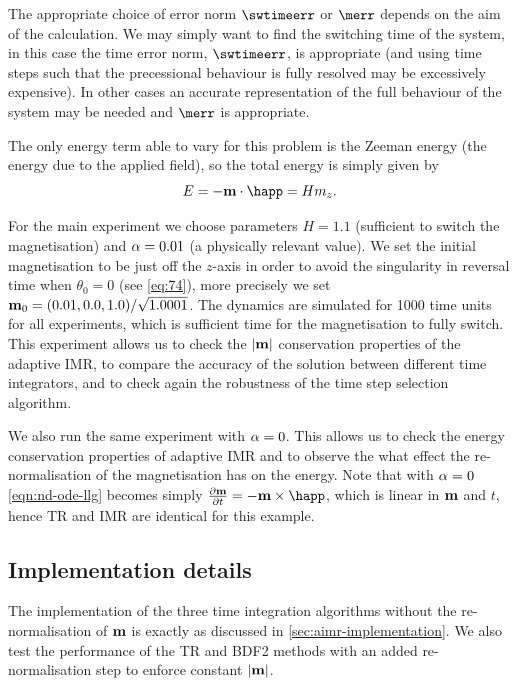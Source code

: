 The appropriate choice of error norm $\swtimeerr$ or $\merr$ depends on the aim of the calculation.
We may simply want to find the switching time of the system, in this case the time error norm, $\swtimeerr$, is appropriate (and using time steps such that the precessional behaviour is fully resolved may be excessively expensive).
In other cases an accurate representation of the full behaviour of the system may be needed and $\merr$ is appropriate.

The only energy term able to vary for this problem is the Zeeman energy (the energy due to the
applied field), so the total energy is simply given by
\begin{equation}
  E = - \mv \cdot \happ = H m_z.
\end{equation}

For the main experiment we choose parameters $H = 1.1$ (sufficient to switch the magnetisation) and $\alpha = 0.01$ (a physically relevant value).
We set the initial magnetisation to be just off the $z$-axis in order to avoid the singularity in reversal time when $\theta_0 = 0$ (see \cref{eq:74}), more precisely we set $\boldsymbol{\mathrm{m}}_0 = (0.01, 0.0, 1.0)/\sqrt{1.0001}$.
The dynamics are simulated for 1000 time units for all experiments, which is sufficient time for the magnetisation to fully switch.
This experiment allows us to check the $\left|{\boldsymbol{\mathrm{m}}} \right|$ conservation properties of the adaptive IMR, to compare the accuracy of the solution between different time integrators, and to check again the robustness of the time step selection algorithm.

We also run the same experiment with $\alpha = 0$.
This allows us to check the energy conservation properties of adaptive IMR and to observe the what effect the re-normalisation of the magnetisation has on the energy.
Note that with $\alpha = 0$ \cref{eqn:nd-ode-llg} becomes simply $\dmdt = - \mv \times \happ$, which is linear in $\boldsymbol{\mathrm{m}}$ and $t$, hence TR and IMR are identical for this example.



\subsection{Implementation details}
\label{sec:impl-deta-ode-llg}

The implementation of the three time integration algorithms without the re-normalisation of $\boldsymbol{\mathrm{m}}$ is exactly as discussed in \cref{sec:aimr-implementation}.
We also test the performance of the TR and BDF2 methods with an added re-normalisation step to enforce constant $\left|{\boldsymbol{\mathrm{m}}} \right|$.

